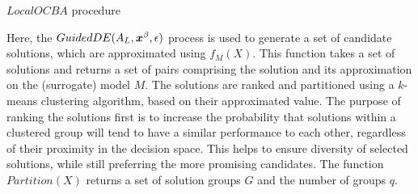 \begin{algorithm}[h!] 
\caption{$LocalOCBA$ procedure}
\label{alg:local-ocba}
{\footnotesize
\begin{algorithmic}[1]
 
 
 
 
\label{while-loop}
   
   
   
   
   
\ENDWHILE
{} 
\end{algorithmic}
}
\end{algorithm}

Here, the $GuidedDE(A_L,\boldsymbol{x}^\beta,\epsilon)$ process is used to generate a set of candidate solutions, which are approximated using $f_M(X)$. This function takes a set of solutions and returns a set of pairs comprising the solution and its approximation on the (surrogate) model $M$. The solutions are ranked and partitioned using a $k$-means clustering algorithm, based on their approximated value. The purpose of ranking the solutions first is to increase the probability that solutions within a clustered group will tend to have a similar performance to each other, regardless of their proximity in the decision space. This helps to ensure diversity of selected solutions, while still preferring the more promising candidates. The function $Partition(X)$ returns a set of solution groups $G$ and the number of groups $q$.


